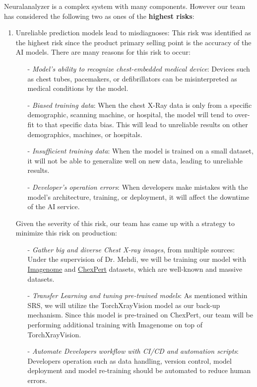 \documentclass{article}
\begin{document}
\begin{enumerate}
    Neuralanalyzer is a complex system with many components. However our team has considered the following two as ones of the \textbf{highest risks}:
    \begin{enumerate}
        \item Unreliable prediction models lead to misdiagnoses: This risk was identified as the highest risk since the product primary selling point is the accuracy of the AI models. There are many reasons for this risk to occur:
        \begin{itemize}
            \item[-] \emph{Model's ability to recognize chest-embedded medical device}: Devices such as chest tubes, pacemakers, or defibrillators can be misinterpreted as medical conditions by the model.
            \item[-] \emph{Biased training data}: When the chest X-Ray data is only from a specific demographic, scanning machine, or hospital, the model will tend to over-fit to that specific data bias. This will lead to unreliable results on other demographics, machines, or hospitals.
            \item[-] \emph{Insufficient training data}: When the model is trained on a small dataset, it will not be able to generalize well on new data, leading to unreliable results.
            \item[-] \emph{Developer's operation errors}: When developers make mistakes with the model's architecture, training, or deployment, it will affect the downtime of the AI service.
        \end{itemize}
        Given the severity of this risk, our team has came up with a strategy to minimize this risk on production:
        \begin{itemize}
            \item[-] \emph{Gather big and diverse Chest X-ray images}, from multiple sources: Under the supervision of Dr. Mehdi, we will be training our model with \href{https://physionet.org/content/chest-imagenome/1.0.0/}{Imagenome} and \href{https://stanfordmlgroup.github.io/competitions/chexpert/}{ChexPert} datasets, which are well-known and massive datasets.
            \item[-] \emph{Transfer Learning and tuning pre-trained models}: As mentioned within SRS, we will utilize the TorchXrayVision model as our back-up mechanism. Since this model is pre-trained on ChexPert, our team will be performing additional training with Imagenome on top of TorchXrayVision.
            \item[-] \emph{Automate Developers workflow with CI/CD and automation scripts}: Developers operation such as data handling, version control, model deployment and model re-training should be automated to reduce human errors.
        \end{itemize}
        

\end{enumerate}
\end{enumerate}
\end{document}
